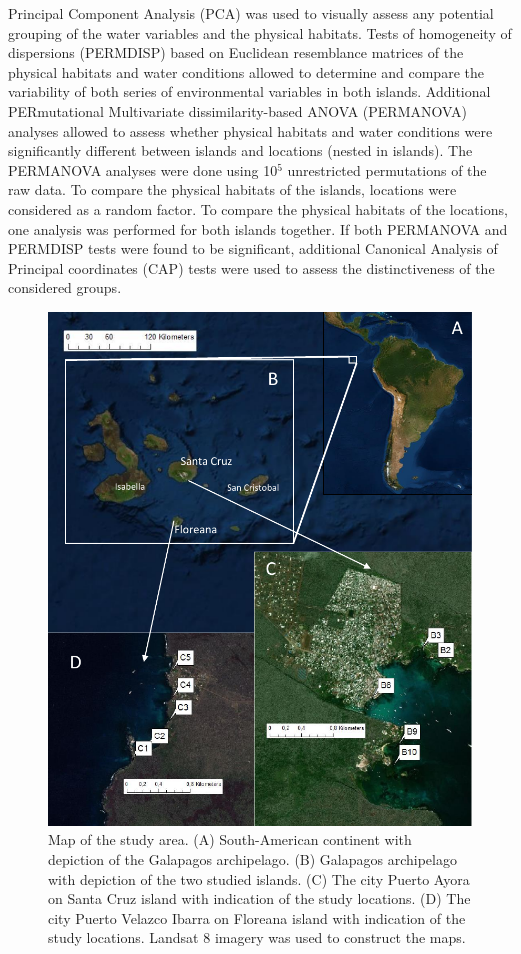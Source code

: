 Principal Component Analysis (PCA) was used to visually assess any potential grouping of the water variables and the physical habitats. Tests of homogeneity of dispersions (PERMDISP) based on Euclidean resemblance matrices of the physical habitats and water conditions allowed to determine and compare the variability of both series of environmental variables in both islands. Additional PERmutational Multivariate dissimilarity-based ANOVA (PERMANOVA) analyses allowed to assess whether physical habitats and water conditions were significantly different between islands and locations (nested in islands). The PERMANOVA analyses were done using 10$^{5}$ unrestricted permutations of the raw data. To compare the physical habitats of the islands, locations were considered as a random factor. To compare the physical habitats of the locations, one analysis was performed for both islands together. If both PERMANOVA and PERMDISP tests were found to be significant, additional Canonical Analysis of Principal coordinates (CAP) tests were used to assess the distinctiveness of the considered groups.   

\begin{figure}[h!]
  \centering\includegraphics[scale=0.8]{MAP}
  \caption{Map of the study area. (A) South-American continent with depiction of the Galapagos archipelago. (B) Galapagos archipelago with depiction of the two studied islands. (C) The city Puerto Ayora on Santa Cruz island with indication of the study locations. (D) The city Puerto Velazco Ibarra on Floreana island with indication of the study locations. Landsat 8 imagery was used to construct the maps.} 
  \label{fig:MAP}
\end{figure}

